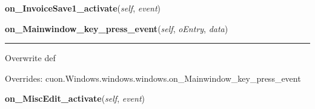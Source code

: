     \vspace{0.5ex}

\hspace{.8\funcindent}\begin{boxedminipage}{\funcwidth}

    \raggedright \textbf{on\_InvoiceSave1\_activate}(\textit{self}, \textit{event})

\setlength{\parskip}{2ex}
\setlength{\parskip}{1ex}
    \end{boxedminipage}

    \vspace{0.5ex}

\hspace{.8\funcindent}\begin{boxedminipage}{\funcwidth}

    \raggedright \textbf{on\_Mainwindow\_key\_press\_event}(\textit{self}, \textit{oEntry}, \textit{data})

    \vspace{-1.5ex}

    \rule{\textwidth}{0.5\fboxrule}
\setlength{\parskip}{2ex}
    Overwrite def

\setlength{\parskip}{1ex}
      Overrides: cuon.Windows.windows.windows.on\_Mainwindow\_key\_press\_event

    \end{boxedminipage}

    \label{cuon:Order:order:orderwindow:on_MiscEdit_activate}

    \vspace{0.5ex}

\hspace{.8\funcindent}\begin{boxedminipage}{\funcwidth}

    \raggedright \textbf{on\_MiscEdit\_activate}(\textit{self}, \textit{event})

\setlength{\parskip}{2ex}
\setlength{\parskip}{1ex}
    \end{boxedminipage}

    \label{cuon:Order:order:orderwindow:on_MiscSave_activate}

